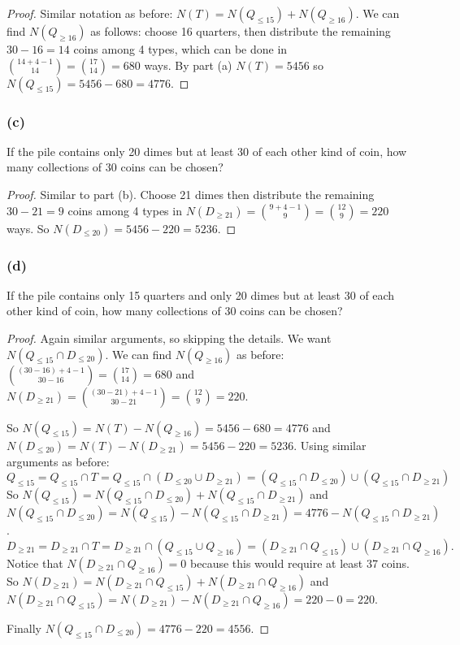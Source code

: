 \documentclass[14pt]{extarticle}
\begin{document}
\begin{proof}
Similar notation as before: \(N(T) = N(Q_{\leq 15}) + N(Q_{\geq 16})\). We can find \(N(Q_{\geq 16})\) as follows:
choose 16 quarters, then distribute the remaining \(30-16=14\) coins among 4 types, which can be done in \(\binom{14+4-1}{14} 
= \binom{17}{14} = 680\) ways. By part (a) \(N(T) = 5456\) so \(N(Q_{\leq 15}) = 5456 - 680 = 4776\).
\end{proof}

\subsubsection{(c)}
If the pile contains only 20 dimes but at least 30 of each other kind of coin, how many collections of 30 coins can be 
chosen?

\begin{proof}
Similar to part (b). Choose 21 dimes then distribute the remaining \(30-21=9\) coins among 4 types in \(N(D_{\geq 21}) 
= \binom{9+4-1}{9} = \binom{12}{9} = 220\) ways. So \(N(D_{\leq 20}) = 5456 - 220 = 5236\).
\end{proof}

\subsubsection{(d)}
If the pile contains only 15 quarters and only 20 dimes but at least 30 of each other kind of coin, how many collections of 
30 coins can be chosen?

\begin{proof}
Again similar arguments, so skipping the details. We want \(N(Q_{\leq 15} \cap D_{\leq 20})\). We can find \(N(Q_{\geq 
16})\) as before: \(\binom{(30-16)+4-1}{30-16} = \binom{17}{14} = 680\) and \(N(D_{\geq 21}) = \binom{(30-21)+4-1}{30-21} 
= \binom{12}{9} = 220\). 

So \(N(Q_{\leq 15}) = N(T) - N(Q_{\geq 16}) = 5456 - 680 = 4776\) and \(N(D_{\leq 20}) = N(T) - N(D_{\geq 21}) = 5456 - 
220 = 5236\). Using similar arguments as before:
\[
Q_{\leq 15} = Q_{\leq 15} \cap T = Q_{\leq 15} \cap (D_{\leq 20} \cup D_{\geq 21}) = (Q_{\leq 15} \cap D_{\leq 20}) \cup
(Q_{\leq 15} \cap D_{\geq 21})
\]
So \(N(Q_{\leq 15}) = N(Q_{\leq 15} \cap D_{\leq 20}) + N(Q_{\leq 15} \cap D_{\geq 21})\) and \(N(Q_{\leq 15} \cap 
D_{\leq 20}) = N(Q_{\leq 15}) - N(Q_{\leq 15} \cap D_{\geq 21}) = 4776 - N(Q_{\leq 15} \cap D_{\geq 21})\).
\[
D_{\geq 21} = D_{\geq 21} \cap T = D_{\geq 21} \cap (Q_{\leq 15} \cup Q_{\geq 16}) = (D_{\geq 21} \cap Q_{\leq 15}) \cup
(D_{\geq 21} \cap Q_{\geq 16}).
\]
Notice that \(N(D_{\geq 21} \cap Q_{\geq 16}) = 0\) because this would require at least 37 coins. So \(N(D_{\geq 21}) = 
N(D_{\geq 21} \cap Q_{\leq 15}) + N(D_{\geq 21} \cap Q_{\geq 16})\) and \(N(D_{\geq 21} \cap Q_{\leq 15}) = N(D_{\geq 21}) 
- N(D_{\geq 21} \cap Q_{\geq 16}) = 220 - 0 = 220\).

Finally \(N(Q_{\leq 15} \cap D_{\leq 20}) = 4776 - 220 = 4556\).
\end{proof}
\end{document}
